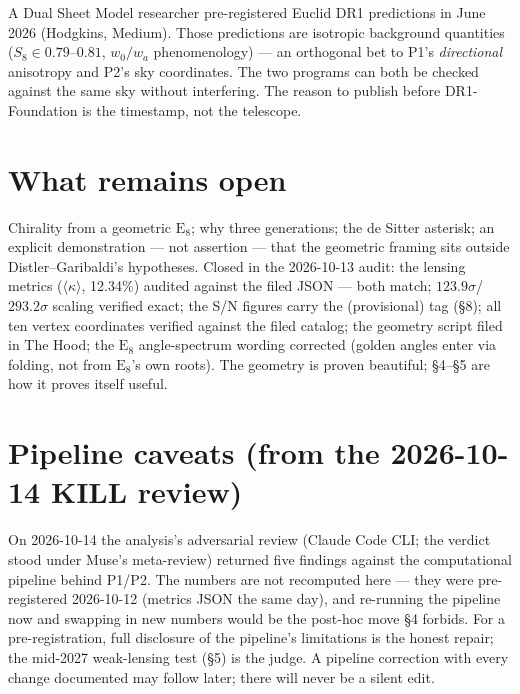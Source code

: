 \documentclass{alienfolio}
\begin{document}
A Dual Sheet Model researcher pre-registered Euclid DR1 predictions in
June 2026 (Hodgkins, Medium). Those predictions are isotropic background
quantities ($S_8 \in 0.79$--$0.81$, $w_0/w_a$ phenomenology) --- an
orthogonal bet to P1's \emph{directional} anisotropy and P2's sky
coordinates. The two programs can both be checked against the same sky
without interfering. The reason to publish before DR1-Foundation is the
timestamp, not the telescope.

\section{What remains open}
\label{sec:open}

Chirality from a geometric $\mathrm{E}_8$; why three generations; the de
Sitter asterisk; an explicit demonstration --- not assertion --- that the
geometric framing sits outside Distler--Garibaldi's hypotheses. Closed in
the 2026-10-13 audit: the lensing metrics ($\langle\kappa\rangle$,
12.34\%) audited against the filed JSON --- both match;
$123.9\sigma$/$293.2\sigma$ scaling verified exact; the S/N figures
carry the (provisional) tag (\S8); all ten vertex coordinates
verified against the filed catalog; the geometry script filed in The Hood;
the $\mathrm{E}_8$ angle-spectrum wording corrected (golden angles enter
via folding, not from $\mathrm{E}_8$'s own roots). The geometry is proven
beautiful; \S4--\S5 are how it proves itself useful.

\section{Pipeline caveats (from the 2026-10-14 KILL review)}
\label{sec:caveats}

On 2026-10-14 the analysis's adversarial review (Claude Code CLI; the
verdict stood under Muse's meta-review) returned five findings against
the computational pipeline behind P1/P2. The numbers are not recomputed
here --- they were pre-registered 2026-10-12 (metrics JSON the same day), and re-running the pipeline now and swapping in new numbers
would be the post-hoc move \S4 forbids. For a pre-registration, full
disclosure of the pipeline's limitations is the honest repair; the
mid-2027 weak-lensing test (\S5) is the judge. A pipeline correction
with every change documented may follow later; there will never be a
silent edit.
\end{document}
